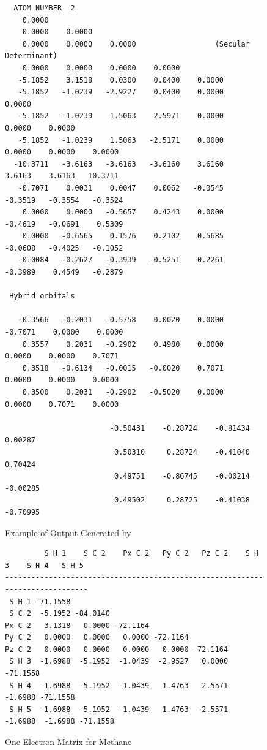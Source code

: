 \begin{figure}
\begin{makeimage}
\end{makeimage}
\compresstable
\begin{verbatim}
  ATOM NUMBER  2
    0.0000
    0.0000    0.0000
    0.0000    0.0000    0.0000                  (Secular Determinant)
    0.0000    0.0000    0.0000    0.0000
   -5.1852    3.1518    0.0300    0.0400    0.0000
   -5.1852   -1.0239   -2.9227    0.0400    0.0000    0.0000
   -5.1852   -1.0239    1.5063    2.5971    0.0000    0.0000    0.0000
   -5.1852   -1.0239    1.5063   -2.5171    0.0000    0.0000    0.0000    0.0000
  -10.3711   -3.6163   -3.6163   -3.6160    3.6160    3.6163    3.6163   10.3711
   -0.7071    0.0031    0.0047    0.0062   -0.3545   -0.3519   -0.3554   -0.3524
    0.0000    0.0000   -0.5657    0.4243    0.0000   -0.4619   -0.0691    0.5309
    0.0000   -0.6565    0.1576    0.2102    0.5685   -0.0608   -0.4025   -0.1052
   -0.0084   -0.2627   -0.3939   -0.5251    0.2261   -0.3989    0.4549   -0.2879

 Hybrid orbitals

   -0.3566   -0.2031   -0.5758    0.0020    0.0000   -0.7071    0.0000    0.0000
    0.3557    0.2031   -0.2902    0.4980    0.0000    0.0000    0.0000    0.7071
    0.3518   -0.6134   -0.0015   -0.0020    0.7071    0.0000    0.0000    0.0000
    0.3500    0.2031   -0.2902   -0.5020    0.0000    0.0000    0.7071    0.0000

                        -0.50431    -0.28724    -0.81434     0.00287
                         0.50310     0.28724    -0.41040     0.70424
                         0.49751    -0.86745    -0.00214    -0.00285
                         0.49502     0.28725    -0.41038    -0.70995
\end{verbatim}
\caption{\label{hyb_ch4}Example of Output Generated by }
\end{figure}

\begin{figure}
\begin{makeimage}
\end{makeimage}
\compresstable
\begin{verbatim}
         S H 1    S C 2    Px C 2   Py C 2   Pz C 2    S H 3    S H 4   S H 5
------------------------------------------------------------------------------
 S H 1 -71.1558
 S C 2  -5.1952 -84.0140
Px C 2   3.1318   0.0000 -72.1164
Py C 2   0.0000   0.0000   0.0000 -72.1164
Pz C 2   0.0000   0.0000   0.0000   0.0000 -72.1164
 S H 3  -1.6988  -5.1952  -1.0439  -2.9527   0.0000 -71.1558
 S H 4  -1.6988  -5.1952  -1.0439   1.4763   2.5571  -1.6988 -71.1558
 S H 5  -1.6988  -5.1952  -1.0439   1.4763  -2.5571  -1.6988  -1.6988 -71.1558
\end{verbatim}
\caption{\label{ch4_1el}One Electron Matrix for Methane}
\end{figure}


